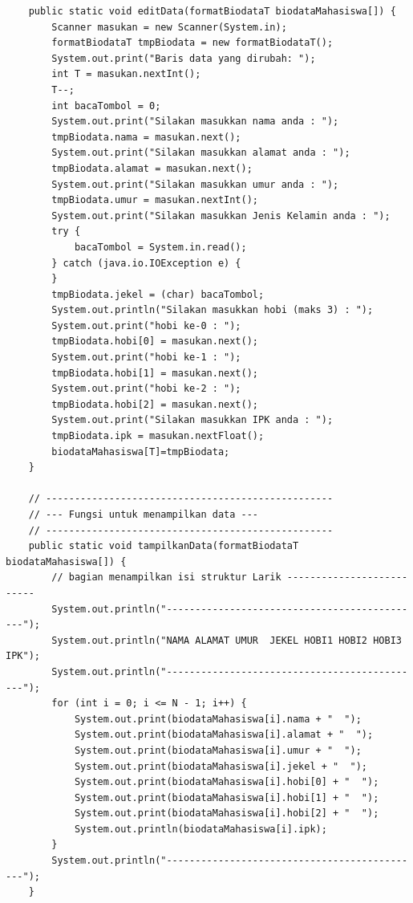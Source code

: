 \documentclass[a4paper,12pt]{article}
\begin{document}
\begin{lstlisting}
    public static void editData(formatBiodataT biodataMahasiswa[]) {
        Scanner masukan = new Scanner(System.in);
        formatBiodataT tmpBiodata = new formatBiodataT();
        System.out.print("Baris data yang dirubah: ");
        int T = masukan.nextInt();
        T--;
        int bacaTombol = 0;
        System.out.print("Silakan masukkan nama anda : ");
        tmpBiodata.nama = masukan.next();
        System.out.print("Silakan masukkan alamat anda : ");
        tmpBiodata.alamat = masukan.next();
        System.out.print("Silakan masukkan umur anda : ");
        tmpBiodata.umur = masukan.nextInt();
        System.out.print("Silakan masukkan Jenis Kelamin anda : ");
        try {
            bacaTombol = System.in.read();
        } catch (java.io.IOException e) {
        }
        tmpBiodata.jekel = (char) bacaTombol;
        System.out.println("Silakan masukkan hobi (maks 3) : ");
        System.out.print("hobi ke-0 : ");
        tmpBiodata.hobi[0] = masukan.next();
        System.out.print("hobi ke-1 : ");
        tmpBiodata.hobi[1] = masukan.next();
        System.out.print("hobi ke-2 : ");
        tmpBiodata.hobi[2] = masukan.next();
        System.out.print("Silakan masukkan IPK anda : ");
        tmpBiodata.ipk = masukan.nextFloat();
        biodataMahasiswa[T]=tmpBiodata;
    }

    // --------------------------------------------------
    // --- Fungsi untuk menampilkan data ---
    // --------------------------------------------------
    public static void tampilkanData(formatBiodataT biodataMahasiswa[]) {
        // bagian menampilkan isi struktur Larik --------------------------
        System.out.println("---------------------------------------------");
        System.out.println("NAMA ALAMAT UMUR  JEKEL HOBI1 HOBI2 HOBI3 IPK");
        System.out.println("---------------------------------------------");
        for (int i = 0; i <= N - 1; i++) {
            System.out.print(biodataMahasiswa[i].nama + "  ");
            System.out.print(biodataMahasiswa[i].alamat + "  ");
            System.out.print(biodataMahasiswa[i].umur + "  ");
            System.out.print(biodataMahasiswa[i].jekel + "  ");
            System.out.print(biodataMahasiswa[i].hobi[0] + "  ");
            System.out.print(biodataMahasiswa[i].hobi[1] + "  ");
            System.out.print(biodataMahasiswa[i].hobi[2] + "  ");
            System.out.println(biodataMahasiswa[i].ipk);
        }
        System.out.println("---------------------------------------------");
    }


\end{lstlisting}
\end{document}
